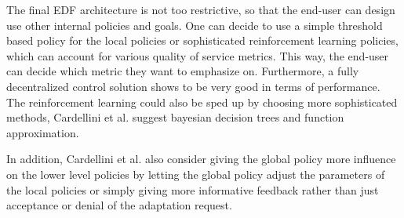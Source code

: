         \quad The final EDF architecture is not too restrictive, so that the end-user can design use other internal policies and goals. 
        One can decide to use a simple threshold based policy for the local policies or sophisticated reinforcement learning policies, which can account for various 
        quality of service metrics. This way, the end-user can decide which metric they want to emphasize on.
        Furthermore, a fully decentralized control solution shows to be very good in terms of performance.
        The reinforcement learning could also be sped up by choosing more sophisticated methods, Cardellini et al. suggest bayesian decision trees and function approximation.

        \quad In addition, Cardellini et al. also consider giving the global policy more influence on the lower level policies by letting the 
        global policy adjust the parameters of the local policies or simply giving more informative feedback rather than just acceptance or denial of the adaptation request.



